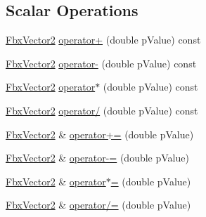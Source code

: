 \subsection*{Scalar Operations}
\begin{DoxyCompactItemize}
\item 
\hyperlink{class_fbx_vector2}{Fbx\+Vector2} \hyperlink{class_fbx_vector2_abe39db5f7fa88c58d5bb6562de8b0e08}{operator+} (double p\+Value) const
\item 
\hyperlink{class_fbx_vector2}{Fbx\+Vector2} \hyperlink{class_fbx_vector2_a2eca389f246807837ecaea008e6a9ac0}{operator-\/} (double p\+Value) const
\item 
\hyperlink{class_fbx_vector2}{Fbx\+Vector2} \hyperlink{class_fbx_vector2_aefff14b357c194d95d842ec09074d75d}{operator$\ast$} (double p\+Value) const
\item 
\hyperlink{class_fbx_vector2}{Fbx\+Vector2} \hyperlink{class_fbx_vector2_a4ce28019385c003ced7bc9c3278ab41a}{operator/} (double p\+Value) const
\item 
\hyperlink{class_fbx_vector2}{Fbx\+Vector2} \& \hyperlink{class_fbx_vector2_a76dca064eec29688ef5ef27be0f6951f}{operator+=} (double p\+Value)
\item 
\hyperlink{class_fbx_vector2}{Fbx\+Vector2} \& \hyperlink{class_fbx_vector2_a9dd2b74e182efcb4c6ccc83f3aa6b111}{operator-\/=} (double p\+Value)
\item 
\hyperlink{class_fbx_vector2}{Fbx\+Vector2} \& \hyperlink{class_fbx_vector2_adb53657fc2234707125a69fa8e8c55e1}{operator$\ast$=} (double p\+Value)
\item 
\hyperlink{class_fbx_vector2}{Fbx\+Vector2} \& \hyperlink{class_fbx_vector2_a3d60afc7bacc3f7db4b455b2aae7d6ec}{operator/=} (double p\+Value)
\end{DoxyCompactItemize}
